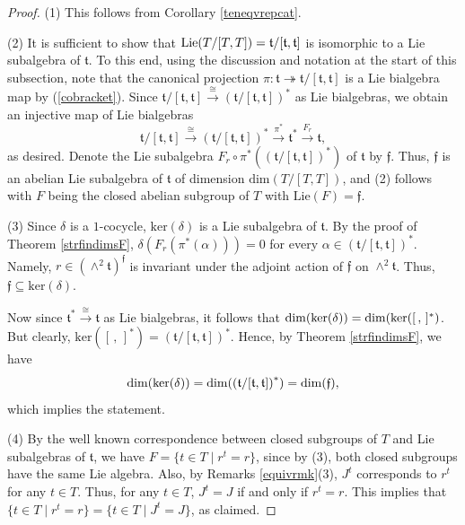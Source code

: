 \documentclass{amsart}
\numberwithin{equation}{section}
\theoremstyle{definition}
\begin{document}
\begin{proof}
(1) This follows from Corollary \ref{teneqvrepcat}.

(2) It is sufficient to show that ${\rm Lie}(T/[T,T]) = \mathfrak{t}/[\mathfrak{t},\mathfrak{t}]$ is isomorphic to a Lie subalgebra of $\mathfrak{t}$. To this end, using the discussion and notation at the start of this subsection, note that  
the canonical projection $\pi:\mathfrak{t}\twoheadrightarrow \mathfrak{t}/[\mathfrak{t},\mathfrak{t}]$ is a Lie bialgebra map by (\ref{cobracket}). Since $\mathfrak{t}/[\mathfrak{t},\mathfrak{t}]\xrightarrow{\cong} \left(\mathfrak{t}/[\mathfrak{t},\mathfrak{t}]\right)^*$ as Lie bialgebras, we obtain an injective map of Lie bialgebras 
$$\mathfrak{t}/[\mathfrak{t},\mathfrak{t}]\xrightarrow{\cong} \left(\mathfrak{t}/[\mathfrak{t},\mathfrak{t}]\right)^*\xrightarrow{\pi^*} \mathfrak{t}^*\xrightarrow{F_r} \mathfrak{t},$$ 
as desired. Denote the Lie subalgebra $F_r \circ \pi^*((\mathfrak{t}/[\mathfrak{t},\mathfrak{t}])^*)$ of $\mathfrak{t}$ by $\mathfrak{f}$. Thus, $\mathfrak{f}$ is an abelian Lie subalgebra of $\mathfrak{t}$ of dimension $\mathrm{dim}(T/[T,T])$, and (2) follows with $F$ being the closed abelian subgroup of $T$ with $\mathrm{Lie}(F) = \mathfrak{f}$.

(3) Since $\delta$ is a $1$-cocycle, $\mathrm{ker}(\delta)$ is a Lie subalgebra of $\mathfrak{t}$. By the proof of Theorem \ref{strfindimsF}, 
$\delta(F_r(\pi^*(\alpha)))=0$ for every $\alpha\in \left(\mathfrak{t}/[\mathfrak{t},\mathfrak{t}]\right)^*$. Namely, $r\in \left(\wedge^2 \mathfrak{t}\right)^{\mathfrak{f}}$ is invariant under the adjoint action of $\mathfrak{f}$ on $\wedge^2 \mathfrak{t}$. Thus, $\mathfrak{f}\subseteq \mathrm{ker}(\delta)$.

Now since $\mathfrak{t}^*\xrightarrow{\cong}\mathfrak{t}$ as Lie bialgebras, it follows that ${\rm dim}(\mathrm{ker}(\delta))={\rm dim}(\mathrm{ker}([\,,\,]^*)$. But clearly, $\mathrm{ker}([\,,\,]^*)=\left(\mathfrak{t}/[\mathfrak{t},\mathfrak{t}]\right)^*$. Hence,
by Theorem \ref{strfindimsF}, we have 
$${\rm dim}(\mathrm{ker}(\delta))={\rm dim}(\left(\mathfrak{t}/[\mathfrak{t},\mathfrak{t}]\right)^*)={\rm dim}(\mathfrak{f}),$$ which implies the statement.

(4) By the well known correspondence between closed subgroups of $T$ and Lie subalgebras of $\mathfrak{t}$, we have $F=\{t\in T \mid r^t = r\}$, since by (3), both closed subgroups have the same Lie algebra. Also, by Remarks \ref{equivrmk}(3), $J^t$ corresponds to $r^t$ for any $t\in T$. Thus, for any $t\in T$, $J^t=J$ if and only if $r^t=r$. This implies that $\{t\in T \mid r^t = r\}=\{t \in T \mid J^t = J \}$, as claimed. 
\end{proof}
\end{document}
